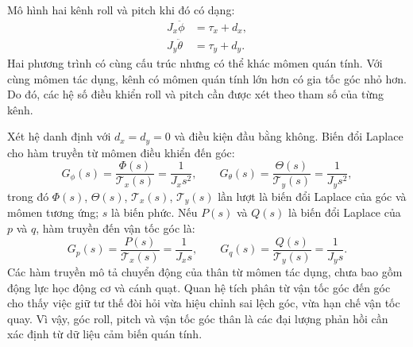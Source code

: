 Mô hình hai kênh roll và pitch khi đó có dạng:
\begin{equation}
	\begin{aligned}
		J_x\ddot\phi   & =\tau_x+d_x, \\
		J_y\ddot\theta & =\tau_y+d_y.
	\end{aligned}
	\label{eq:background-small-angle-dynamics}
\end{equation}
Hai phương trình có cùng cấu trúc nhưng có thể khác mômen quán tính. Với cùng mômen tác dụng, kênh có mômen quán tính lớn hơn có gia tốc góc nhỏ hơn. Do đó, các hệ số điều khiển roll và pitch cần được xét theo tham số của từng kênh.

Xét hệ danh định với $d_x=d_y=0$ và điều kiện đầu bằng không. Biến đổi Laplace cho hàm truyền từ mômen điều khiển đến góc:
\begin{equation}
	G_\phi(s)=\frac{\Phi(s)}{\mathcal{T}_x(s)}=\frac{1}{J_x s^2},\qquad
	G_\theta(s)=\frac{\Theta(s)}{\mathcal{T}_y(s)}=\frac{1}{J_y s^2},
	\label{eq:background-angle-transfer-functions}
\end{equation}
trong đó $\Phi(s)$, $\Theta(s)$, $\mathcal{T}_x(s)$, $\mathcal{T}_y(s)$ lần lượt là biến đổi Laplace của góc và mômen tương ứng; $s$ là biến phức. Nếu $P(s)$ và $Q(s)$ là biến đổi Laplace của $p$ và $q$, hàm truyền đến vận tốc góc là:
\begin{equation}
	G_p(s)=\frac{P(s)}{\mathcal{T}_x(s)}=\frac{1}{J_x s},\qquad
	G_q(s)=\frac{Q(s)}{\mathcal{T}_y(s)}=\frac{1}{J_y s}.
	\label{eq:background-rate-transfer-functions}
\end{equation}
Các hàm truyền mô tả chuyển động của thân từ mômen tác dụng, chưa bao gồm động lực học động cơ và cánh quạt. Quan hệ tích phân từ vận tốc góc đến góc cho thấy việc giữ tư thế đòi hỏi vừa hiệu chỉnh sai lệch góc, vừa hạn chế vận tốc quay. Vì vậy, góc roll, pitch và vận tốc góc thân là các đại lượng phản hồi cần xác định từ dữ liệu cảm biến quán tính.
